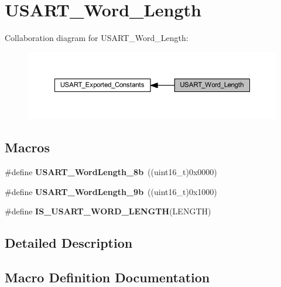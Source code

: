 \hypertarget{group___u_s_a_r_t___word___length}{}\section{U\+S\+A\+R\+T\+\_\+\+Word\+\_\+\+Length}
\label{group___u_s_a_r_t___word___length}
Collaboration diagram for U\+S\+A\+R\+T\+\_\+\+Word\+\_\+\+Length\+:
\nopagebreak
\begin{figure}[H]
\begin{center}
\leavevmode
\includegraphics[width=350pt]{group___u_s_a_r_t___word___length}
\end{center}
\end{figure}
\subsection*{Macros}
\begin{DoxyCompactItemize}
\item 
\mbox{\label{group___u_s_a_r_t___word___length_ga08682faddc657df85a93627b5a146c25}} 
\#define {\bfseries U\+S\+A\+R\+T\+\_\+\+Word\+Length\+\_\+8b}~((uint16\+\_\+t)0x0000)
\item 
\mbox{\label{group___u_s_a_r_t___word___length_gae7dd162142660e09e2321aa3f33dc4d2}} 
\#define {\bfseries U\+S\+A\+R\+T\+\_\+\+Word\+Length\+\_\+9b}~((uint16\+\_\+t)0x1000)
\item 
\#define {\bfseries I\+S\+\_\+\+U\+S\+A\+R\+T\+\_\+\+W\+O\+R\+D\+\_\+\+L\+E\+N\+G\+TH}(L\+E\+N\+G\+TH)
\end{DoxyCompactItemize}


\subsection{Detailed Description}


\subsection{Macro Definition Documentation}
\mbox{\label{group___u_s_a_r_t___word___length_ga5b07b29ee91f0bea4c10ec0fd74fbc04}} 
